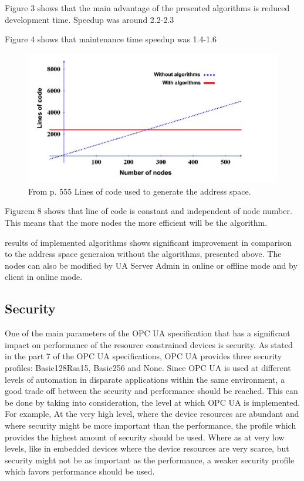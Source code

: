 \documentclass[conference]{IEEEtran}
\begin{document}
Figure 3 shows that the main advantage of the presented algorithms is reduced development time. Speedup was around 2.2-2.3

Figure 4 shows that  maintenance time speedup was 1.4-1.6 

\begin{figure}[ht]
\centering
\includegraphics[width=1\linewidth]{Figures/NodeAlgorithm}\quad
\caption[Subfigure example]{\label{f:NodeAlgorithm}From \cite{addressspace2012efficient} p. 555 Lines of code used to generate the address space.}
\end{figure}

Figurem 8 shows that line of code is constant and independent of node number. This means that the more nodes the more efficient will be the algorithm. 

results of implemented algorithms shows significant improvement in comparison to the address space generaion without the algorithms, presented above. The nodes can also be modified by UA Server Admin in online or offline mode and by client in online mode.

\subsection{Security}
One of the main parameters of the OPC UA specification that has a significant impact on performance of the resource constrained devices is security. As stated in the part 7 of the OPC UA specifications, OPC UA provides three security profiles: Basic128Rsa15, Basic256 and None. Since OPC UA is used at different levels of automation in disparate applications within the same environment, a good trade off between the security and performance should be reached. This can be done by taking into consideration, the level at which OPC UA is implemented. For example, At the very high level, where the device resources are abundant and where security might be more important than the performance, the profile which provides the highest amount of security should be used. Where as at very low levels, like in embedded devices where the device resources are very scarce, but security might not be as important as the performance, a weaker security profile which favors performance should be used.
\end{document}
